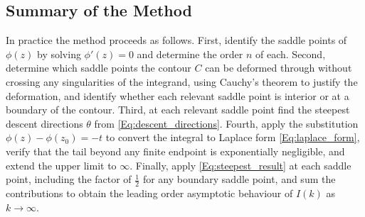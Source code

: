 \subsection{Summary of the Method}

In practice the method proceeds as follows. First, identify the saddle points 
of $\phi(z)$ by solving $\phi'(z) = 0$ and determine the order $n$ of each. 
Second, determine which saddle points the contour $C$ can be deformed through 
without crossing any singularities of the integrand, using Cauchy's theorem to 
justify the deformation, and identify whether each relevant saddle point is 
interior or at a boundary of the contour. Third, at each relevant saddle point 
find the steepest descent directions $\theta$ from \eqref{Eq:descent_directions}. 
Fourth, apply the substitution $\phi(z) - \phi(z_0) = -t$ to convert the 
integral to Laplace form \eqref{Eq:laplace_form}, verify that the tail beyond 
any finite endpoint is exponentially negligible, and extend the upper limit to 
$\infty$. Finally, apply \eqref{Eq:steepest_result} at each saddle point, 
including the factor of $\frac{1}{2}$ for any boundary saddle point, and sum 
the contributions to obtain the leading order asymptotic behaviour of $I(k)$ 
as $k \to \infty$.



